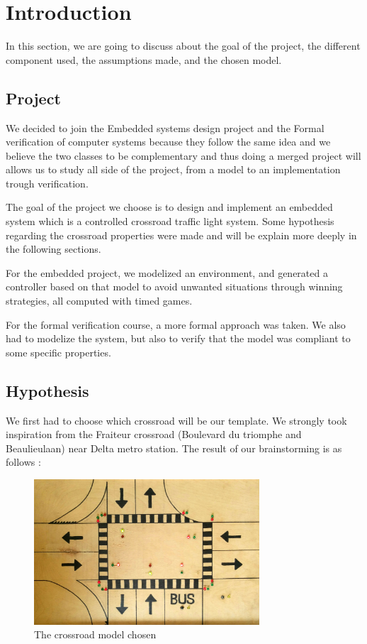 \section{Introduction}
In this section, we are going to discuss about the goal of the project, the different component used, the assumptions made, and the chosen model.

\subsection{Project}

We decided to join the Embedded systems design project and the Formal verification of computer systems because they follow the same idea and we believe the two classes to be complementary and thus doing a merged project will allows us to study all side of the project, from a model to an implementation trough verification.

The goal of the project we choose is to design and implement an embedded system which is a controlled crossroad traffic light system. Some hypothesis regarding the crossroad properties were made and will be explain more deeply in the following sections.

For the embedded project, we modelized an environment, and generated a controller based on that model to avoid unwanted situations through winning strategies, all computed with timed games. 

For the formal verification course, a more formal approach was taken. We also had to modelize the system, but also to verify that the model was compliant to some specific properties. 

\subsection{Hypothesis}

We first had to choose which crossroad will be our template. We strongly took inspiration from the Fraiteur crossroad (Boulevard du triomphe and Beaulieulaan) near Delta metro station. The result of our brainstorming is as follows :

\begin{figure}[!ht] \label{fig:crossroad}
  \centering
    \includegraphics[width=0.75\textwidth]{../common/images/wood-crossroad.jpg}
    \caption{The crossroad model chosen}
\end{figure}

